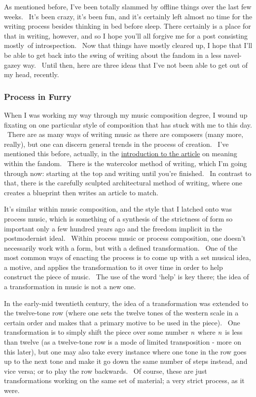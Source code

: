 As mentioned before, I've been totally slammed by offline things over
the last few weeks. ~It's been crazy, it's been fun, and it's certainly
left almost no time for the writing process besides thinking in bed
before sleep. There certainly is a place for that in writing, however,
and so I hope you'll all forgive me for a post consisting mostly~of
introspection. ~Now that things have mostly cleared up, I hope that I'll
be able to get back into the swing of writing about the fandom in a less
navel-gazey way. ~Until then, here are three ideas that I've not been
able to get out of my head, recently.

\subsubsection{Process in Furry}\label{process-in-furry}

When I was working my way through my music composition degree, I wound
up fixating on one particular style of composition that has stuck with
me to this day. ~There are as many ways of writing music as there are
composers (many more, really), but one can discern general trends in the
process of creation. ~I've mentioned this before, actually, in the
\href{http://adjectivespecies.com/2012/04/11/meaning-within-a-subculture-part-1/}{introduction
to the article} on meaning within the fandom. ~There is the watercolor
method of writing, which I'm going through now: starting at the top and
writing until you're finished. ~In contrast to that, there is the
carefully sculpted architectural method of writing, where one creates a
blueprint then writes an article to match.

It's similar within music composition, and the style that I latched onto
was process music, which is something of a synthesis of the strictness
of form so important only a few hundred years ago and the freedom
implicit in the postmodernist ideal. ~Within process music or process
composition, one doesn't necessarily work with a form, but with a
defined transformation. ~One of the most common ways of enacting the
process is to come up with a set musical idea, a motive, and applies the
transformation to it over time in order to help construct the piece of
music. ~The use of the word `help' is key there; the idea of a
transformation in music is not a new one.

In the early-mid twentieth century, the idea of a transformation was
extended to the twelve-tone row (where one sets the twelve tones of the
western scale in a certain order and makes that a primary motive to be
used in the piece). ~One transformation is to simply shift the piece
over some number \emph{n}~where \emph{n}~is less than twelve (as a
twelve-tone row is a mode of limited transposition - more on this
later), but one may also take every instance where one tone in the row
goes up to the next tone and make it go down the same number of steps
instead, and vice versa; or to play the row backwards. ~Of course, these
are just transformations working on the same set of material; a very
strict process, as it were.

